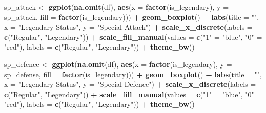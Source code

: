 \documentclass[
]{article}
\newenvironment{Shaded}{\begin{snugshade}}{\end{snugshade}}
\newcommand{\AttributeTok}[1]{\textcolor[rgb]{0.13,0.29,0.53}{#1}}
\newcommand{\FunctionTok}[1]{\textcolor[rgb]{0.13,0.29,0.53}{\textbf{#1}}}
\newcommand{\NormalTok}[1]{#1}
\newcommand{\OtherTok}[1]{\textcolor[rgb]{0.56,0.35,0.01}{#1}}
\newcommand{\SpecialCharTok}[1]{\textcolor[rgb]{0.81,0.36,0.00}{\textbf{#1}}}
\newcommand{\StringTok}[1]{\textcolor[rgb]{0.31,0.60,0.02}{#1}}
\begin{document}
\begin{Shaded}
\begin{Highlighting}[]
\NormalTok{sp\_attack }\OtherTok{\textless{}{-}} \FunctionTok{ggplot}\NormalTok{(}\FunctionTok{na.omit}\NormalTok{(df), }\FunctionTok{aes}\NormalTok{(}\AttributeTok{x =} \FunctionTok{factor}\NormalTok{(is\_legendary), }\AttributeTok{y =}\NormalTok{ sp\_attack, }\AttributeTok{fill =} \FunctionTok{factor}\NormalTok{(is\_legendary))) }\SpecialCharTok{+}
  \FunctionTok{geom\_boxplot}\NormalTok{() }\SpecialCharTok{+}
  \FunctionTok{labs}\NormalTok{(}\AttributeTok{title =} \StringTok{""}\NormalTok{, }\AttributeTok{x =} \StringTok{"Legendary Status"}\NormalTok{, }\AttributeTok{y =} \StringTok{"Special Attack"}\NormalTok{) }\SpecialCharTok{+}
  \FunctionTok{scale\_x\_discrete}\NormalTok{(}\AttributeTok{labels =} \FunctionTok{c}\NormalTok{(}\StringTok{"Regular"}\NormalTok{, }\StringTok{"Legendary"}\NormalTok{)) }\SpecialCharTok{+}
  \FunctionTok{scale\_fill\_manual}\NormalTok{(}\AttributeTok{values =} \FunctionTok{c}\NormalTok{(}\StringTok{"1"} \OtherTok{=} \StringTok{"blue"}\NormalTok{, }\StringTok{"0"} \OtherTok{=} \StringTok{"red"}\NormalTok{), }\AttributeTok{labels =} \FunctionTok{c}\NormalTok{(}\StringTok{"Regular"}\NormalTok{, }\StringTok{"Legendary"}\NormalTok{)) }\SpecialCharTok{+}
  \FunctionTok{theme\_bw}\NormalTok{()}

\NormalTok{sp\_defence }\OtherTok{\textless{}{-}} \FunctionTok{ggplot}\NormalTok{(}\FunctionTok{na.omit}\NormalTok{(df), }\FunctionTok{aes}\NormalTok{(}\AttributeTok{x =} \FunctionTok{factor}\NormalTok{(is\_legendary), }\AttributeTok{y =}\NormalTok{ sp\_defense, }\AttributeTok{fill =} \FunctionTok{factor}\NormalTok{(is\_legendary))) }\SpecialCharTok{+}
  \FunctionTok{geom\_boxplot}\NormalTok{() }\SpecialCharTok{+}
  \FunctionTok{labs}\NormalTok{(}\AttributeTok{title =} \StringTok{""}\NormalTok{, }\AttributeTok{x =} \StringTok{"Legendary Status"}\NormalTok{, }\AttributeTok{y =} \StringTok{"Special Defence"}\NormalTok{) }\SpecialCharTok{+}
  \FunctionTok{scale\_x\_discrete}\NormalTok{(}\AttributeTok{labels =} \FunctionTok{c}\NormalTok{(}\StringTok{"Regular"}\NormalTok{, }\StringTok{"Legendary"}\NormalTok{)) }\SpecialCharTok{+}
  \FunctionTok{scale\_fill\_manual}\NormalTok{(}\AttributeTok{values =} \FunctionTok{c}\NormalTok{(}\StringTok{"1"} \OtherTok{=} \StringTok{"blue"}\NormalTok{, }\StringTok{"0"} \OtherTok{=} \StringTok{"red"}\NormalTok{), }\AttributeTok{labels =} \FunctionTok{c}\NormalTok{(}\StringTok{"Regular"}\NormalTok{, }\StringTok{"Legendary"}\NormalTok{)) }\SpecialCharTok{+}
  \FunctionTok{theme\_bw}\NormalTok{()}


\end{Highlighting}
\end{Shaded}
\end{document}
